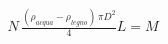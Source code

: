 \documentclass[preview]{standalone}
\begin{document}
\begin{align*}
N\,\tfrac{(\rho_{acqua}-\rho_{legno})\,\pi D^2}{4}L = M
\end{align*}
\end{document}
